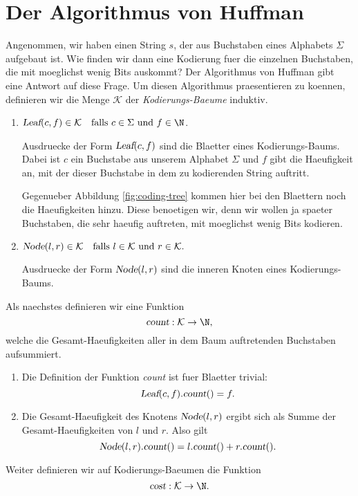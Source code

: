 \section{Der Algorithmus von Huffman}
Angenommen, wir haben einen String $s$, der aus Buchstaben eines Alphabets $\Sigma$
aufgebaut ist.  Wie finden wir dann eine Kodierung fuer die einzelnen Buchstaben, die
mit moeglichst wenig Bits auskommt?  Der Algorithmus von Huffman gibt eine Antwort auf diese
Frage. Um diesen Algorithmus praesentieren zu koennen, definieren wir die Menge
$\mathcal{K}$ der \emph{Kodierungs-Baeume} induktiv.  
\begin{enumerate}
\item $\textsl{Leaf}(c,f) \in \mathcal{K} \quad \mbox{falls $c \in \Sigma$ und $f \in \N$}$.

      Ausdruecke der Form $\textsl{Leaf}(c,f)$ sind die Blaetter eines Kodierungs-Baums.
      Dabei ist $c$ ein Buchstabe aus unserem Alphabet $\Sigma$ und $f$ gibt die
      Haeufigkeit an, mit der dieser Buchstabe in dem zu kodierenden String auftritt.

      Gegenueber Abbildung \ref{fig:coding-tree} kommen hier bei den Blaettern noch die
      Haeufigkeiten hinzu.  Diese benoetigen wir, denn wir wollen ja spaeter Buchstaben,
      die sehr haeufig auftreten, mit moeglichst wenig Bits kodieren.  

\item $\textsl{Node}(l,r) \in \mathcal{K} \quad 
       \mbox{falls $l \in\mathcal{K}$ und $r \in \mathcal{K}$.}$ 

      Ausdruecke der Form $\textsl{Node}(l,r)$ sind die inneren Knoten eines
      Kodierungs-Baums.  
\end{enumerate}
Als naechstes  definieren wir eine Funktion 
\[  \textsl{count} : \mathcal{K} \rightarrow \N, \]
welche die  Gesamt-Haeufigkeiten aller in dem Baum auftretenden Buchstaben aufsummiert.
\begin{enumerate}
\item Die Definition der Funktion \textsl{count} ist fuer Blaetter trivial:
      \[ \textsl{Leaf}(c,f).\textsl{count}() = f. \]
\item Die Gesamt-Haeufigkeit des Knotens $\textsl{Node}(l,r)$
      ergibt sich als Summe der Gesamt-Haeufigkeiten von $l$ und $r$. Also gilt
      \[ \textsl{Node}(l,r).\textsl{count}() = l.\textsl{count}() + r.\textsl{count}(). \]
\end{enumerate}
Weiter definieren wir auf Kodierungs-Baeumen die Funktion
\[ \textsl{cost}: \mathcal{K} \rightarrow \N. \]
